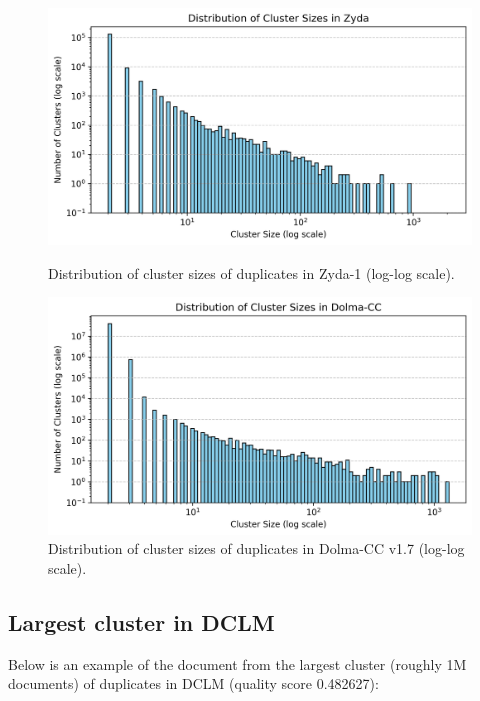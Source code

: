 \documentclass[conference]{IEEEtran}
\begin{document}
\begin{figure}[h]
    \centering
    \begin{minipage}{.49\textwidth}
        \centering
        \includegraphics[width=\textwidth]{figures/distr_clusters_zyda.png}
        \caption{Distribution of cluster sizes of duplicates in Zyda-1 (log-log scale).}
        \label{fig:distr_clusters_zyda}
    \end{minipage}\hfill
    \begin{minipage}{.49\textwidth}
        \centering
        \includegraphics[width=\textwidth]{figures/distr_clusters_dolma-cc.png}
        \caption{Distribution of cluster sizes of duplicates in Dolma-CC v1.7 (log-log scale).}
        \label{fig:distr_clusters_dolma-cc}
    \end{minipage}
\end{figure}
\twocolumn


\clearpage
\newpage

\subsection{Largest cluster in DCLM}
Below is an example of the document from the largest cluster (roughly 1M documents) of duplicates in DCLM (quality score 0.482627):
\end{document}

